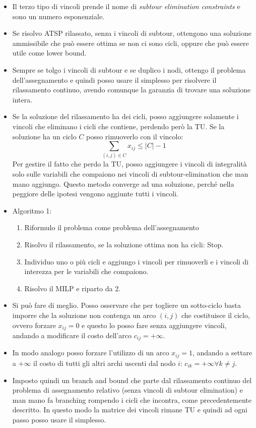 \begin{itemize}
	\item Il terzo tipo di vincoli prende il nome di \textit{subtour elimination constraints} e sono un numero esponenziale.
	\item Se risolvo ATSP rilassato, senza i vincoli di subtour, ottengono una soluzione ammissibile che può essere ottima se non ci sono cicli, oppure che può essere utile come lower bound.
	\item Sempre se tolgo i vincoli di subtour e se duplico i nodi, ottengo il problema dell'assegnamento e quindi posso usare il simplesso per risolvere il rilassamento continuo, avendo comunque la garanzia di trovare una soluzione intera.
	\item Se la soluzione del rilassamento ha dei cicli, posso aggiungere solamente i vincoli che eliminano i cicli che contiene, perdendo però la TU. Se la soluzione ha un ciclo $C$ posso rimuoverlo con il vincolo:
	$$
	\sum_{(i,j) \in C} x_{ij} \leq |C| -1 
	$$
	Per gestire il fatto che perdo la TU, posso aggiungere i vincoli di integralità solo sulle variabili che compaiono nei vincoli di subtour-elimination che man mano aggiungo. Questo metodo converge ad una soluzione, perché nella peggiore delle ipotesi vengono aggiunte tutti i vincoli.
	\item Algoritmo 1:
	\begin{enumerate}
		\item Riformulo il problema come problema dell'assegnamento
		\item Risolvo il rilassamento, se la soluzione ottima non ha cicli: Stop.
		\item Individuo uno o più cicli e aggiungo i vincoli per rimuoverli e i vincoli di interezza per le variabili che compaiono.
		\item Risolvo il MILP e riparto da 2.
	\end{enumerate}
	\item Si può fare di meglio. Posso osservare che per togliere un sotto-ciclo basta imporre che la soluzione non contenga un arco $(i,j)$ che costituisce il ciclo, ovvero forzare $x_{ij} = 0$ e questo lo posso fare senza aggiungere vincoli, andando a modificare il costo dell'arco $c_{ij} = +\infty$.
	\item In modo analogo posso forzare l'utilizzo di un arco $x_{ij} = 1$, andando a settare a $+\infty$ il costo di tutti gli altri archi uscenti dal nodo $i$: $c_{ik} = +\infty \forall k \neq j$.
	\item Imposto quindi un branch and bound che parte dal rilassamento continuo del problema di assegnamento relativo (senza vincoli di subtour elimination) e man mano fa branching rompendo i cicli che incontra, come precedentemente descritto. In questo modo la matrice dei vincoli rimane TU e quindi ad ogni passo posso usare il simplesso.

\end{itemize}

